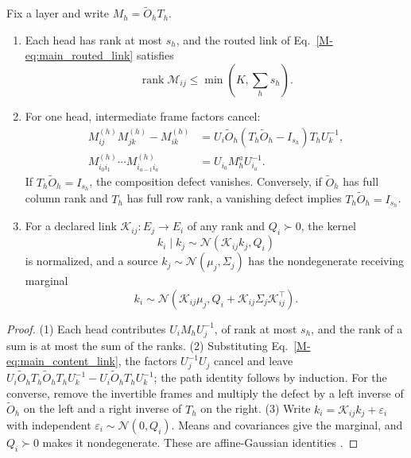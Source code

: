 \documentclass[twoside,11pt]{article}
\begin{document}
\begin{proposition}
\label{prop:link_algebra}
Fix a layer and write $M_h=\widetilde O_hT_h$.
\begin{enumerate}
\item Each head has rank at most $s_h$, and the routed link of Eq.~\eqref{M-eq:main_routed_link} satisfies
\begin{equation}
\operatorname{rank}\mathcal M_{ij}
\le\min\left(K,\sum_hs_h\right).
\label{eq:main_link_rank}
\end{equation}
\item For one head, intermediate frame factors cancel:
\begin{align}
M_{ij}^{(h)}M_{jk}^{(h)}-M_{ik}^{(h)}
&=U_i\widetilde O_h(T_h\widetilde O_h-I_{s_h})T_hU_k^{-1},\\
M_{i_0i_1}^{(h)}\cdots M_{i_{a-1}i_a}^{(h)}
&=U_{i_0}M_h^aU_{i_a}^{-1}.
\label{eq:main_link_composition}
\end{align}
If $T_h\widetilde O_h=I_{s_h}$, the composition defect vanishes. Conversely, if $\widetilde O_h$ has full column rank and $T_h$ has full row rank, a vanishing defect implies $T_h\widetilde O_h=I_{s_h}$.
\item For a declared link $\mathcal K_{ij}:E_j\to E_i$ of any rank and $Q_i\succ0$, the kernel
\begin{equation}
k_i\mid k_j\sim\mathcal N(\mathcal K_{ij}k_j,Q_i)
\label{eq:main_gaussian_link_kernel}
\end{equation}
is normalized, and a source $k_j\sim\mathcal N(\mu_j,\Sigma_j)$ has the nondegenerate receiving marginal
\begin{equation}
k_i\sim\mathcal N\left(
\mathcal K_{ij}\mu_j,
Q_i+\mathcal K_{ij}\Sigma_j\mathcal K_{ij}^{\top}\right).
\label{eq:main_gaussian_link_marginal}
\end{equation}
\end{enumerate}
\end{proposition}
\begin{proof}
(1) Each head contributes $U_iM_hU_j^{-1}$, of rank at most $s_h$, and the rank of a sum is at most the sum of the ranks. (2) Substituting Eq.~\eqref{M-eq:main_content_link}, the factors $U_j^{-1}U_j$ cancel and leave $U_i\widetilde O_hT_h\widetilde O_hT_hU_k^{-1}-U_i\widetilde O_hT_hU_k^{-1}$; the path identity follows by induction. For the converse, remove the invertible frames and multiply the defect by a left inverse of $\widetilde O_h$ on the left and a right inverse of $T_h$ on the right. (3) Write $k_i=\mathcal K_{ij}k_j+\varepsilon_i$ with independent $\varepsilon_i\sim\mathcal N(0,Q_i)$. Means and covariances give the marginal, and $Q_i\succ0$ makes it nondegenerate. These are affine-Gaussian identities \citep{Bishop2006}.
\end{proof}
\end{document}
